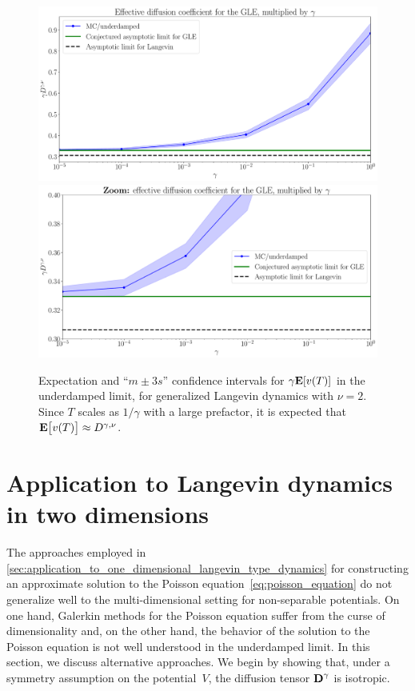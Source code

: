 \documentclass[11pt,a4paper]{article}
\begin{document}
\begin{figure}[ht]
    \centering
    \includegraphics[width=0.9\linewidth]{figures/mobility_gle.pdf}
    \includegraphics[width=0.9\linewidth]{figures/mobility_gle_zoom.pdf}
    \caption{%
        Expectation and ``$m \pm 3 s$'' confidence intervals for $\gamma \mathbf{E} [v(T)]$ in the underdamped limit,
        for generalized Langevin dynamics with $\nu = 2$.
        Since $T$ scales as $1/\gamma$ with a large prefactor,
        it is expected that $\mathbf{E} \bigl[ v(T) \bigr] \approx D^{\gamma,\nu}$.
    }
    \label{fig:effective_diffusion_gle}
\end{figure}


\section{Application to Langevin dynamics in two dimensions}%
\label{sec:applications_2d}%
The approaches employed in \cref{sec:application_to_one_dimensional_langevin_type_dynamics} for constructing an approximate solution to the Poisson equation~\eqref{eq:poisson_equation}
do not generalize well to the multi-dimensional setting for non-separable potentials.
On one hand, Galerkin methods for the Poisson equation suffer from the curse of dimensionality and,
on the other hand, the behavior of the solution to the Poisson equation is not well understood in the underdamped limit.
In this section, we discuss alternative approaches.
We begin by showing that,
under a symmetry assumption on the potential~$V$,
the diffusion tensor $\boldsymbol{\mathbf D}^{\gamma}$ is isotropic.
\end{document}
